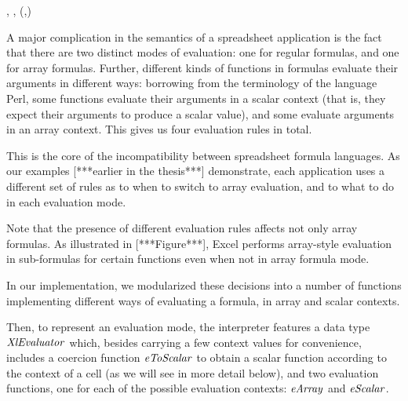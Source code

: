 \begin{hscode}\SaveRestoreHook
{}%
%
\>[B]{}\mathbin{::}\;\llparenthesis \cdot , \cdot \rrparenthesis \to {}\to {}\to \llparenthesis \cdot , \cdot \rrparenthesis \to {}\to (,){}\<[E]%
\ColumnHook
\end{hscode}\resethooks

A major complication in the semantics of a spreadsheet application is the
fact that there are two distinct modes of evaluation: one for regular formulas,
and one for array formulas. Further, different kinds of functions in formulas
evaluate their arguments in different ways: borrowing from the terminology
of the language Perl, some functions evaluate their arguments in a scalar
context (that is, they expect their arguments to produce a scalar value),
and some evaluate arguments in an array context. This gives us four evaluation
rules in total.

This is the core of the incompatibility between spreadsheet formula languages.
As our examples [***earlier in the thesis***] demonstrate, each application uses
a different set of rules as to when to switch to array evaluation, and to what
to do in each evaluation mode.

Note that the presence of different evaluation rules affects not only array
formulas. As illustrated in [***Figure***], Excel performs array-style
evaluation in sub-formulas for certain functions even when not in array
formula mode.

In our implementation, we modularized these decisions into a number of
functions implementing different ways of evaluating a formula, in array and
scalar contexts.

Then, to represent an evaluation mode, the interpreter features a data type
\ensuremath{\Conid{XlEvaluator}} which, besides carrying a few context values for convenience,
includes a coercion function \ensuremath{\Varid{eToScalar}} to obtain a scalar function according
to the context of a cell (as we will see in more detail below), and two
evaluation functions, one for each of the possible evaluation contexts:
\ensuremath{\Varid{eArray}} and \ensuremath{\Varid{eScalar}}.

